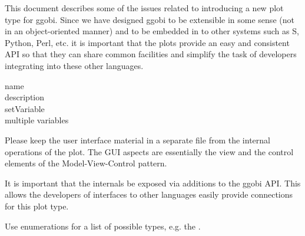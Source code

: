 \documentclass{article}
\begin{document}
This document describes some of the issues related to introducing a
new plot type for ggobi.  Since we have designed ggobi to be
extensible in some sense (not in an object-oriented manner) and to be
embedded in to other systems such as S, Python, Perl, etc.  it is
important that the plots provide an easy and consistent API so that
they can share common facilities and simplify the task of developers
integrating into these other languages.

\begin{description}
\item[name] 
\item[description]
\item[setVariable]
\item[multiple variables]
\end{description}


Please keep the user interface material in a separate file from the
internal operations of the plot.  The GUI aspects are essentially the
view and the control elements of the Model-View-Control
pattern\cite{DesignPatterns}.

It is important that the internals be exposed via additions to the
ggobi API. This allows the developers of interfaces to other languages
easily provide connections for this plot type.

Use enumerations for a list of possible types,
e.g. the .
\end{document}

